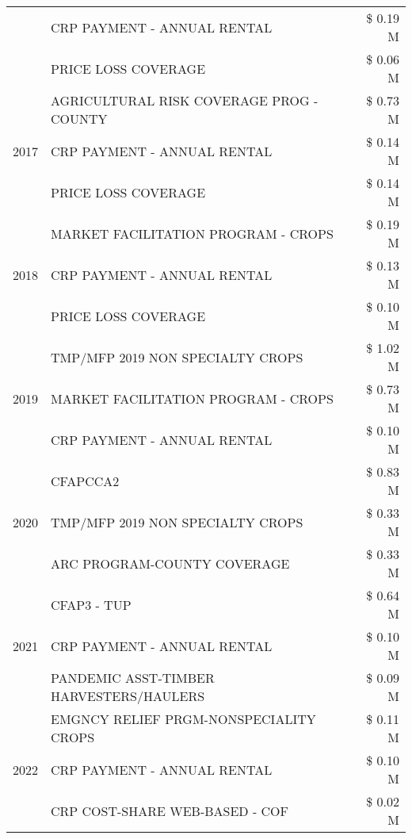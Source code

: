 \begin{tabular}{llr}
 & CRP PAYMENT - ANNUAL RENTAL & \$ 0.19 M \\
 & PRICE LOSS COVERAGE & \$ 0.06 M \\
\cline{1-3}
\multirow[t]{3}{*}{2017} & AGRICULTURAL RISK COVERAGE PROG - COUNTY & \$ 0.73 M \\
 & CRP PAYMENT - ANNUAL RENTAL & \$ 0.14 M \\
 & PRICE LOSS COVERAGE & \$ 0.14 M \\
\cline{1-3}
\multirow[t]{3}{*}{2018} & MARKET FACILITATION PROGRAM - CROPS & \$ 0.19 M \\
 & CRP PAYMENT - ANNUAL RENTAL & \$ 0.13 M \\
 & PRICE LOSS COVERAGE & \$ 0.10 M \\
\cline{1-3}
\multirow[t]{3}{*}{2019} & TMP/MFP 2019 NON SPECIALTY CROPS & \$ 1.02 M \\
 & MARKET FACILITATION PROGRAM - CROPS & \$ 0.73 M \\
 & CRP PAYMENT - ANNUAL RENTAL & \$ 0.10 M \\
\cline{1-3}
\multirow[t]{3}{*}{2020} & CFAPCCA2 & \$ 0.83 M \\
 & TMP/MFP 2019 NON SPECIALTY CROPS & \$ 0.33 M \\
 & ARC PROGRAM-COUNTY COVERAGE & \$ 0.33 M \\
\cline{1-3}
\multirow[t]{3}{*}{2021} & CFAP3 - TUP & \$ 0.64 M \\
 & CRP PAYMENT - ANNUAL RENTAL & \$ 0.10 M \\
 & PANDEMIC ASST-TIMBER HARVESTERS/HAULERS & \$ 0.09 M \\
\cline{1-3}
\multirow[t]{3}{*}{2022} & EMGNCY RELIEF PRGM-NONSPECIALITY CROPS & \$ 0.11 M \\
 & CRP PAYMENT - ANNUAL RENTAL & \$ 0.10 M \\
 & CRP COST-SHARE WEB-BASED - COF & \$ 0.02 M \\
\cline{1-3}
\bottomrule
\end{tabular}

